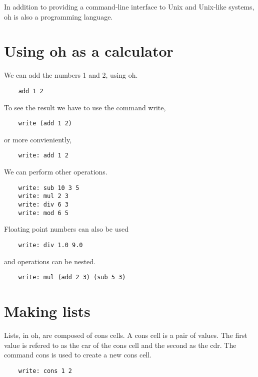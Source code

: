 \documentclass[12pt]{book}
\begin{document}
In addition to providing a command-line interface to Unix and
Unix-like systems, oh is also a programming language.


\section{Using oh as a calculator}

We can add the numbers 1 and 2, using oh.

\begin{lstlisting}
	add 1 2
\end{lstlisting}

To see the result we have to use the command write,

\begin{lstlisting}
	write (add 1 2)
\end{lstlisting}

or more convieniently,

\begin{lstlisting}
	write: add 1 2
\end{lstlisting}

We can perform other operations.

\begin{lstlisting}
	write: sub 10 3 5
	write: mul 2 3
	write: div 6 3
	write: mod 6 5
\end{lstlisting}

Floating point numbers can also be used

\begin{lstlisting}
	write: div 1.0 9.0
\end{lstlisting}

and operations can be nested.

\begin{lstlisting}
	write: mul (add 2 3) (sub 5 3)
\end{lstlisting}


\section{Making lists}

Lists, in oh, are composed of cons cells. A cons cell is a pair of
values. The first value is refered to as the car of the cons cell and
the second as the cdr. The command cons is used to create a new cons
cell.

\begin{lstlisting}
	write: cons 1 2
\end{lstlisting}
\end{document}
